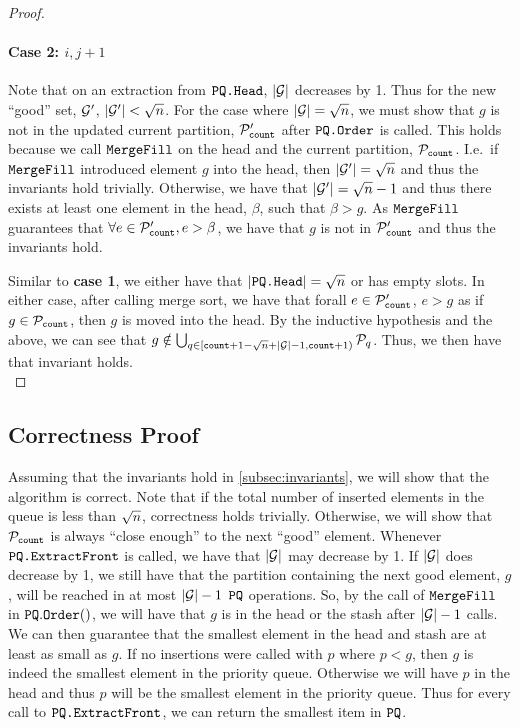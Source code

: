 \begin{proof}

\paragraph*{Case 2: $i, j + 1$} Note that on an extraction from $\texttt{PQ.Head}$, $|\mathcal{G}|$ decreases by 1. Thus for the new ``good'' set, $\mathcal{G}'$, $|\mathcal{G}'| < {\sqrt{n}}$.
For the case where $|\mathcal{G}| = {\sqrt{n}}$, we must show that $g$ is not in the updated current partition, $\mathcal{P}'_{\texttt{count}}$ after $\texttt{PQ.Order}$ is called.
This holds because we call $\texttt{MergeFill}$ on the head and the current partition, $\mathcal{P}_{\texttt{count}}$. I.e.\ if $\texttt{MergeFill}$ introduced element $g$
into the head, then $|\mathcal{G}'| = {\sqrt{n}}$ and thus the invariants hold trivially. Otherwise, we have that $|\mathcal{G}'| = {\sqrt{n}} - 1$ and thus there exists at least one element in the head, $\beta$, such that $\beta > g$.
As $\texttt{MergeFill}$ guarantees that $\forall e \in \mathcal{P}'_{\texttt{count}}, e > \beta$, we have that $g$ is not in $\mathcal{P}'_{\texttt{count}}$ and thus the invariants hold.

Similar to \textbf{case 1}, we either have that $|\texttt{PQ.Head}| = {\sqrt{n}}$ or has empty slots. In either case, after calling merge sort,
we have that forall $e \in \mathcal{P}'_{\texttt{count}}$, $e > g$ as if $g  \in \mathcal{P}_{\texttt{count}}$, then $g$ is moved into the head.
By the inductive hypothesis and the above, we can see that $g \notin \bigcup_{q \in [{\texttt{count}} + 1 - {\sqrt{n}} + |\mathcal{G}| - 1, {\texttt{count}} + 1)} \mathcal{P}_q$. Thus, we then have that invariant holds.\\

\end{proof}

\subsection{Correctness Proof}
Assuming that the invariants hold in \cref{subsec:invariants}, we will show that the algorithm is correct.
Note that if the total number of inserted elements in the queue is less than ${\sqrt{n}}$, correctness holds trivially.
Otherwise, we will show that $\mathcal{P}_{\texttt{count}}$ is always ``close enough'' to the next ``good'' element.
Whenever $\texttt{PQ.ExtractFront}$ is called, we have that $|\mathcal{G}|$ may decrease by 1. If $|\mathcal{G}|$ does decrease by 1,
we still have that the partition containing the next good element, $g$, will be reached in at most $|\mathcal{G}| - 1$ $\texttt{PQ}$ operations.
So, by the call of $\texttt{MergeFill}$ in $\texttt{PQ}.\texttt{Order}()$, we will have that $g$ is in the head or the stash
after $|\mathcal{G}| - 1$ calls. We can then guarantee that the smallest element in the head and stash are at least as small as $g$.
If no insertions were called with $p$ where $p < g$, then $g$ is indeed the smallest element in the priority queue.
Otherwise we will have $p$ in the head and thus $p$ will be the smallest element in the priority queue.
Thus for every call to $\texttt{PQ.ExtractFront}$, we can return the smallest item in $\texttt{PQ}$.


